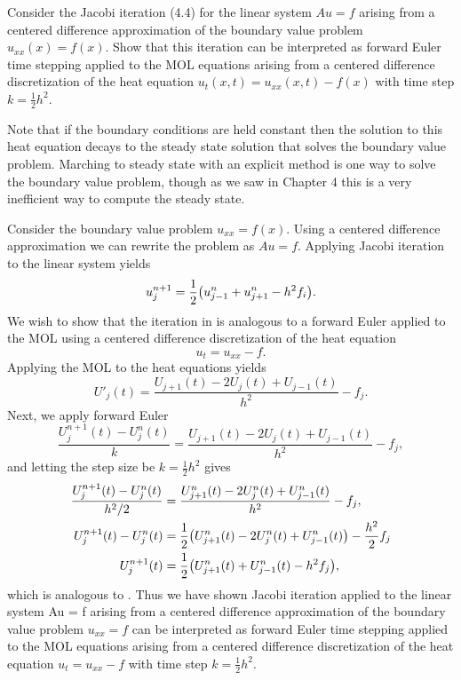 \documentclass[12pt]{report}
\begin{document}
\begin{problem}
    Consider the Jacobi iteration (4.4) for the linear system $A u=f$ arising from a centered difference approximation of the boundary value problem $u_{x x}(x)=f(x)$. Show that this iteration can be interpreted as forward Euler time stepping applied to the MOL equations arising from a centered difference discretization of the heat equation $u_{t}(x, t)=u_{x x}(x, t)-f(x)$ with time step $k=\frac{1}{2} h^{2}$.
  
  Note that if the boundary conditions are held constant then the solution to this heat equation decays to the steady state solution that solves the boundary value problem. Marching to steady state with an explicit method is one way to solve the boundary value problem, though as we saw in Chapter 4 this is a very inefficient way to compute the steady state. 
\end{problem}

\begin{solution}

    \noindent
    Consider the boundary value problem $u_{xx} = f(x)$. Using a centered difference approximation we can rewrite the problem as $Au = f$. Applying Jacobi iteration to the linear system yields
    \begin{equation} \label{6sol}
      u_{j}^{n+1} = \frac{1}{2}{\left(u_{j-1}^{n} + u_{j+1}^{n} - h^2 f_i\right)}.      
    \end{equation}
    We wish to show that the iteration in  is analogous to a forward Euler applied to the MOL using a centered difference discretization of the heat equation
    \[
      u_t = u_{xx} - f.
    \]
    Applying the MOL to the heat equations yields
    \[
      U'_j(t) = \frac{U_{j+1}(t) - 2U_j(t) + U_{j-1}(t)}{h^2} - f_j.
    \]
    Next, we apply forward Euler
    \[
      \frac{U_{j}^{n+1}(t) - U_{j}^{n}(t)}{k} = \frac{U_{j+1}(t) - 2U_j(t) + U_{j-1}(t)}{h^2} - f_j,
    \]
    and letting the step size be $k = \frac{1}{2}h^2$ gives
    \begin{align*}
      \frac{U_{j}^{n+1}(t) - U_{j}^{n}(t)}{h^2/2} &= \frac{U_{j+1}^n(t) - 2U_j^n(t) + U_{j-1}^n(t)}{h^2} - f_j,\\
      U_{j}^{n+1}(t) - U_{j}^{n}(t) &= \frac{1}{2}{\left(U_{j+1}^n(t) - 2U_j^n(t) + U_{j-1}^n(t)\right)} - \frac{h^2}{2}f_j\\
      U_{j}^{n+1}(t) &= \frac{1}{2}{\left(U_{j+1}^n(t) + U_{j-1}^n(t) - h^2f_j\right)},\\
    \end{align*}
    which is analogous to . Thus we have shown Jacobi iteration applied to the linear system Au = f arising from a centered difference approximation of the boundary value problem $u_{xx} = f$ can be interpreted as forward Euler time stepping applied to the MOL equations arising from a centered difference discretization of the heat equation $u_t = u_{xx} - f$ with time step $k = \frac{1}{2}h^2$. 

\end{solution}
\end{document}
